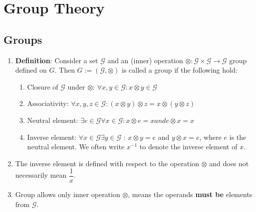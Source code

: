 \chapter{Group Theory}




\section{Groups}

\begin{enumerate}
    \item \textbf{Definition}: Consider a set $\mathcal{G}$ and an (inner) operation $\otimes : \mathcal{G} \times \mathcal{G} \to \mathcal{G}$ group defined on $G$. Then $G := (\mathcal{G}, \otimes)$ is called a group if the following hold:
    \hfill \cite{mfml/book/mml/Deisenroth-Faisal-Ong}
    \begin{enumerate}
        \item Closure of $\mathcal{G}$ under $\otimes$: $\forall x, y \in \mathcal{G} : x \otimes y \in \mathcal{G}$
        \hfill \cite{mfml/book/mml/Deisenroth-Faisal-Ong}

        \item Associativity: $\forall x, y, z \in  \mathcal{G} : (x \otimes  y) \otimes  z = x \otimes  (y \otimes  z)$
        \hfill \cite{mfml/book/mml/Deisenroth-Faisal-Ong}

        \item Neutral element: $\exists e \in  \mathcal{G} \forall x \in  \mathcal{G} : x \otimes  e = x and e \otimes  x = x$
        \hfill \cite{mfml/book/mml/Deisenroth-Faisal-Ong}

        \item Inverse element: $\forall x \in  \mathcal{G} \exists y \in  \mathcal{G}$ : $x \otimes  y = e$ and $y \otimes  x = e$, where $e$ is the neutral element. We often write $x^{-1}$ to denote the inverse element of $x$.
        \hfill \cite{mfml/book/mml/Deisenroth-Faisal-Ong}
    \end{enumerate}

    \item The inverse element is defined with respect to the operation $\otimes$ and does not necessarily mean $\dfrac{1}{x}$.
    \hfill \cite{mfml/book/mml/Deisenroth-Faisal-Ong}

    \item Group allows only inner operation $\otimes$, means the operands \textbf{must be} elements from $\mathcal{G}$.


\end{enumerate}
